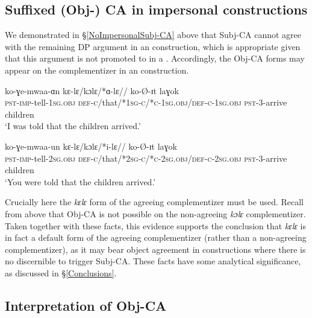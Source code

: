 \documentclass[output=paper
,newtxmath
,modfonts
,nonflat]{langsci/langscibook}
\begin{document}
\subsection{Suffixed (Obj-) CA in impersonal constructions}
We demonstrated in \S \ref{NoImpersonalSubj-CA} above that Subj-CA cannot agree with the remaining DP argument in an  construction, which is appropriate given that this argument is not promoted to  in a  . Accordingly, the Obj-CA forms may appear on the complementizer in an  construction. 

\ea
\begin{xlist}

\ex
\gll ko-ɣe-mwaa-ɑn kɛ-lɛ/kɔlɛ/*ɑ-lɛ// ko-\O-ɪt laɣok  \\
\textsc{pst}-\textsc{imp}-tell-1\textsc{sg}.\textsc{obj} \textsc{def}-\textsc{c}/that/*1\textsc{sg-c/*c-}1\textsc{sg}.\textsc{obj}/\textsc{def}-\textsc{c}-1\textsc{sg}.\textsc{obj} \textsc{pst}-3-arrive children \\
\glt `I was told that the children arrived.' 

\ex
\gll ko-ɣe-mwaa-un kɛ-lɛ/kɔlɛ/*i-lɛ// ko-\O-ɪt laɣok \\
\textsc{pst}-\textsc{imp}-tell-2\textsc{sg}.\textsc{obj} \textsc{def}-\textsc{c}/that/*2\textsc{sg-c/*c-}2\textsc{sg}.\textsc{obj}/\textsc{def}-\textsc{c}-2\textsc{sg}.\textsc{obj} \textsc{pst}-3-arrive children\\
\glt `You were told that the children arrived.' 

\end{xlist}
\z

\noindent Crucially here the \textit{kɛlɛ} form of the agreeing complementizer must be used. Recall from above that Obj-CA is not possible on the non-agreeing \textit{kɔlɛ} complementizer. Taken together with these facts, this evidence  supports the conclusion that \textit{kɛlɛ} is in fact a default form of the agreeing complementizer (rather than a non-agreeing complementizer), as it may bear object agreement in  constructions where there is no discernible  to trigger Subj-CA. These facts have some analytical significance, as discussed in \S \ref{Conclusions}.

\subsection{Interpretation of Obj-CA} \label{Obj-CA Interpretation}
\end{document}
